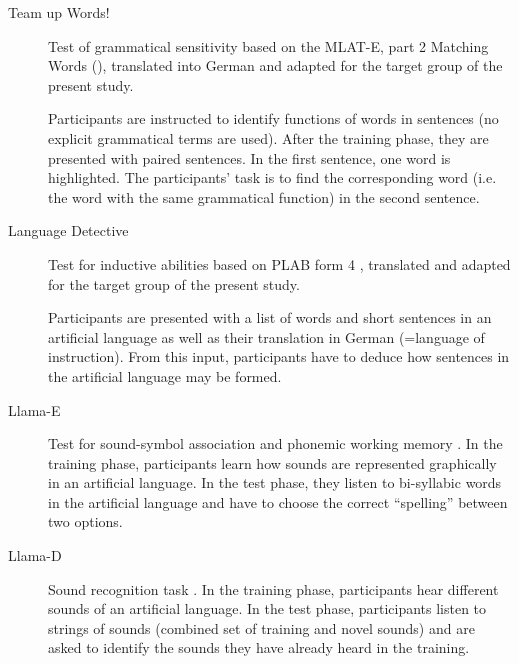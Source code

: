 \documentclass[output=paper]{langsci/langscibook}
\begin{document}
\begin{description}\sloppy
\item[Team up Words!] Test of grammatical sensitivity based on the MLAT-E, part 2 Matching Words (\citealt{CarrollSapon2010}), translated into German and adapted for the target group of the present study.

Participants are instructed to identify functions of words in sentences (no explicit grammatical terms are used). After the training phase, they are presented with paired sentences. In the first sentence, one word is highlighted. The participants’ task is to find the corresponding word (i.e. the word with the same grammatical function) in the second sentence.

\item[Language Detective] Test for inductive abilities based on PLAB form 4 \citep{PimsleurEtAl2004}, translated and adapted for the target group of the present study.

Participants are presented with a list of words and short sentences in an artificial language as well as their translation in German (=language of instruction). From this input, participants have to deduce how sentences in the artificial language may be formed.

\item[Llama-E] Test for sound-symbol association and phonemic working memory \citep{MearaEtAl2001}. In the training phase, participants learn how sounds are represented graphically in an artificial language. In the test phase, they listen to bi-syllabic words in the artificial language and have to choose the correct “spelling” between two options.

\item[Llama-D] Sound recognition task \citep{MearaEtAl2001}. In the training phase, participants hear different sounds of an artificial language. In the test phase, participants listen to strings of sounds (combined set of training and novel sounds) and are asked to identify the sounds they have already heard in the training.
\end{description}
\end{document}
